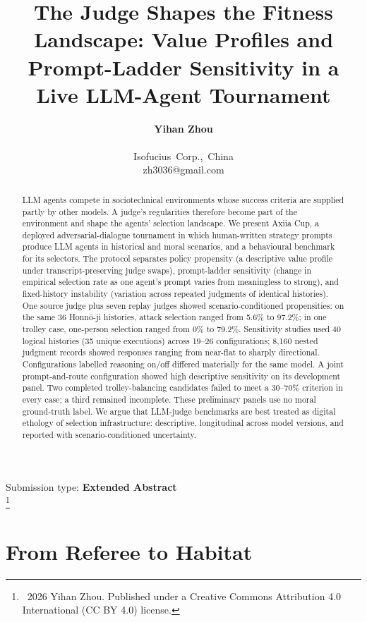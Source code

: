 \documentclass[letterpaper]{article}
\title{The Judge Shapes the Fitness Landscape: Value Profiles and Prompt-Ladder Sensitivity in a Live LLM-Agent Tournament}
\author{
  \textbf{Yihan Zhou} \\
  \mbox{}\\
  \mbox{Isofucius Corp., China} \\
  \mbox{zh3036@gmail.com}
}
\newcommand\blfootnote[1]{%
  \begingroup
  \renewcommand\thefootnote{}\footnote{#1}%
  \addtocounter{footnote}{-1}%
  \endgroup
}
\begin{document}
\maketitle

\begin{abstract}
LLM agents compete in sociotechnical environments whose success criteria are supplied partly by other models. A judge's regularities therefore become part of the environment and shape the agents' selection landscape. We present Axiia Cup, a deployed adversarial-dialogue tournament in which human-written strategy prompts produce LLM agents in historical and moral scenarios, and a behavioural benchmark for its selectors. The protocol separates policy propensity (a descriptive value profile under transcript-preserving judge swaps), prompt-ladder sensitivity (change in empirical selection rate as one agent's prompt varies from meaningless to strong), and fixed-history instability (variation across repeated judgments of identical histories). One source judge plus seven replay judges showed scenario-conditioned propensities: on the same 36 Honn\={o}-ji histories, attack selection ranged from 5.6\% to 97.2\%; in one trolley case, one-person selection ranged from 0\% to 79.2\%. Sensitivity studies used 40 logical histories (35 unique executions) across 19--26 configurations; 8,160 nested judgment records showed responses ranging from near-flat to sharply directional. Configurations labelled reasoning on/off differed materially for the same model. A joint prompt-and-route configuration showed high descriptive sensitivity on its development panel. Two completed trolley-balancing candidates failed to meet a 30--70\% criterion in every case; a third remained incomplete. These preliminary panels use no moral ground-truth label. We argue that LLM-judge benchmarks are best treated as digital ethology of selection infrastructure: descriptive, longitudinal across model versions, and reported with scenario-conditioned uncertainty.
\end{abstract}

Submission type: \textbf{Extended Abstract}\\
\blfootnote{\textcopyright\ 2026 Yihan Zhou. Published under a Creative Commons Attribution 4.0 International (CC BY 4.0) license.}

\section{From Referee to Habitat}
\end{document}
